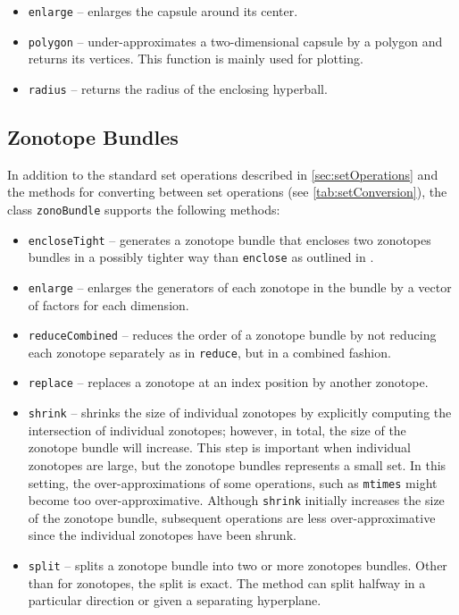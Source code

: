 \begin{itemize}
    \item \texttt{enlarge} -- enlarges the capsule around its center.
    \item \texttt{polygon} -- under-approximates a two-dimensional capsule by a polygon and returns its vertices.
    This function is mainly used for plotting.
    \item \texttt{radius} -- returns the radius of the enclosing hyperball.
\end{itemize}



\subsection{Zonotope Bundles}    \label{sec:zonoBundleOperations}

In addition to the standard set operations described in \cref{sec:setOperations} and the methods for converting between set operations (see \cref{tab:setConversion}), the class \texttt{zonoBundle} supports the following methods:

\begin{itemize}
    \item \texttt{encloseTight} -- generates a zonotope bundle that encloses two zonotopes bundles in a possibly tighter way than \texttt{enclose} as outlined in \cite[Sec. VI.A]{Althoff2011f}.
    \item \texttt{enlarge} -- enlarges the generators of each zonotope in the bundle by a vector of factors for each dimension.
    \item \texttt{reduceCombined} -- reduces the order of a zonotope bundle by not reducing
    each zonotope separately as in \texttt{reduce}, but in a combined fashion.
    \item \texttt{replace} -- replaces a zonotope at an index position by another zonotope.
    \item \texttt{shrink} -- shrinks the size of individual zonotopes by explicitly computing the intersection of individual zonotopes; however, in total, the size of the zonotope bundle will increase. This step is important when individual zonotopes are large, but the zonotope bundles represents a small set. In this setting, the over-approximations of some operations, such as \texttt{mtimes} might become too over-approximative. Although \texttt{shrink} initially increases the size of the zonotope bundle, subsequent operations are less over-approximative since the individual zonotopes have been shrunk.
    \item \texttt{split} -- splits a zonotope bundle into two or more zonotopes bundles. Other than for zonotopes, the split is exact. The method can split halfway in a particular direction or given a separating hyperplane.
\end{itemize}


